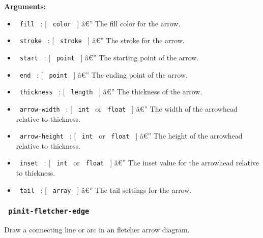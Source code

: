 \textbf{Arguments:}

\begin{itemize}
\tightlist
\item
  \texttt{\ fill\ } : {[} \texttt{\ color\ } {]} â€'' The fill color for
  the arrow.
\item
  \texttt{\ stroke\ } : {[} \texttt{\ stroke\ } {]} â€'' The stroke for
  the arrow.
\item
  \texttt{\ start\ } : {[} \texttt{\ point\ } {]} â€'' The starting
  point of the arrow.
\item
  \texttt{\ end\ } : {[} \texttt{\ point\ } {]} â€'' The ending point of
  the arrow.
\item
  \texttt{\ thickness\ } : {[} \texttt{\ length\ } {]} â€'' The
  thickness of the arrow.
\item
  \texttt{\ arrow-width\ } : {[} \texttt{\ int\ } or \texttt{\ float\ }
  {]} â€'' The width of the arrowhead relative to thickness.
\item
  \texttt{\ arrow-height\ } : {[} \texttt{\ int\ } or \texttt{\ float\ }
  {]} â€'' The height of the arrowhead relative to thickness.
\item
  \texttt{\ inset\ } : {[} \texttt{\ int\ } or \texttt{\ float\ } {]}
  â€'' The inset value for the arrowhead relative to thickness.
\item
  \texttt{\ tail\ } : {[} \texttt{\ array\ } {]} â€'' The tail settings
  for the arrow.
\end{itemize}

\subsubsection{\texorpdfstring{\texttt{\ pinit-fletcher-edge\ }}{ pinit-fletcher-edge }}\label{pinit-fletcher-edge}

Draw a connecting line or arc in an fletcher arrow diagram.

\begin{Shaded}
\begin{Highlighting}[]
\end{Highlighting}
\end{Shaded}

